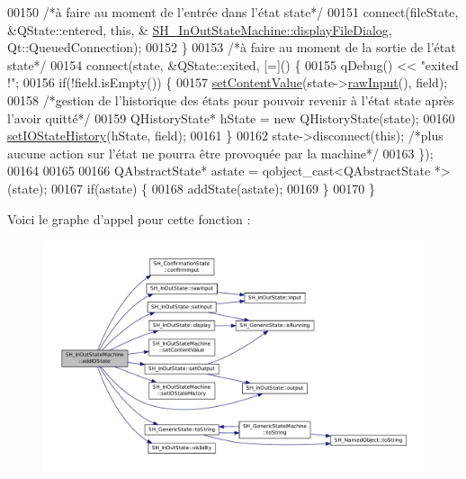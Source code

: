 \begin{DoxyCode}
00150         \textcolor{comment}{/*à faire au moment de l'entrée dans l'état state*/}
00151         connect(fileState, &QState::entered, \textcolor{keyword}{this}, &
      \hyperlink{classSH__InOutStateMachine_abd206c3bc32bb7690df9c3e1cd546ebc}{SH\_InOutStateMachine::displayFileDialog}, Qt::QueuedConnection);
00152     \}
00153     \textcolor{comment}{/*à faire au moment de la sortie de l'état state*/}
00154     connect(state, &QState::exited, [=]() \{
00155         qDebug() << \textcolor{stringliteral}{"exited !"};
00156         \textcolor{keywordflow}{if}(!field.isEmpty()) \{
00157             \hyperlink{classSH__InOutStateMachine_a9ab1534306b2bdb62743d4bcefe40c17}{setContentValue}(state->\hyperlink{classSH__InOutState_a4c674a54f41d2e6ef951b22393dcd89f}{rawInput}(), field);
00158             \textcolor{comment}{/*gestion de l'historique des états pour pouvoir revenir à l'état state après l'avoir quitté*/}
00159             QHistoryState* hState = \textcolor{keyword}{new} QHistoryState(state);
00160             \hyperlink{classSH__InOutStateMachine_acbcce2c4300af1634d928b30e5e9be1c}{setIOStateHistory}(hState, field);
00161         \}
00162         state->disconnect(\textcolor{keyword}{this}); \textcolor{comment}{/*plus aucune action sur l'état ne pourra être provoquée par la machine*/}
00163     \});
00164 
00165 
00166     QAbstractState* astate = qobject\_cast<QAbstractState *>(state);
00167     \textcolor{keywordflow}{if}(astate) \{
00168         addState(astate);
00169     \}
00170 \}
\end{DoxyCode}


Voici le graphe d'appel pour cette fonction \-:\nopagebreak
\begin{figure}[H]
\begin{center}
\leavevmode
\includegraphics[width=350pt]{classSH__InOutStateMachine_a2528cffddbe6f98c32ebef41423c0118_cgraph}
\end{center}
\end{figure}





